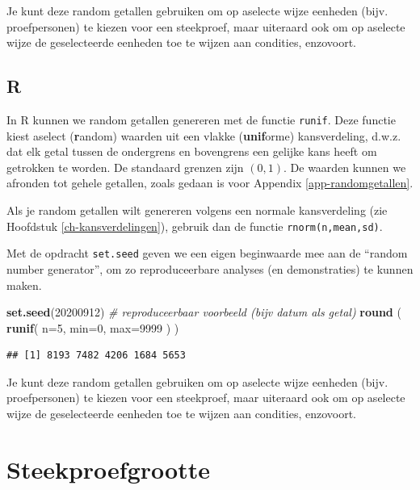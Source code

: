 \documentclass[
]{book}
\newenvironment{Shaded}{\begin{snugshade}}{\end{snugshade}}
\newcommand{\AttributeTok}[1]{\textcolor[rgb]{0.13,0.29,0.53}{#1}}
\newcommand{\CommentTok}[1]{\textcolor[rgb]{0.56,0.35,0.01}{\textit{#1}}}
\newcommand{\DecValTok}[1]{\textcolor[rgb]{0.00,0.00,0.81}{#1}}
\newcommand{\FunctionTok}[1]{\textcolor[rgb]{0.13,0.29,0.53}{\textbf{#1}}}
\newcommand{\NormalTok}[1]{#1}
\begin{document}
Je kunt deze random getallen gebruiken om op aselecte wijze eenheden (bijv. proefpersonen) te kiezen voor een steekproef, maar uiteraard ook om op aselecte wijze de geselecteerde eenheden toe te wijzen aan condities, enzovoort.

\subsection{R}\label{r}

In R kunnen we random getallen genereren met de functie \texttt{runif}. Deze functie kiest aselect (\textbf{r}andom) waarden uit een vlakke (\textbf{unif}orme) kansverdeling, d.w.z. dat elk getal tussen de ondergrens en bovengrens een gelijke kans heeft om getrokken te worden. De standaard grenzen zijn \((0,1)\). De waarden kunnen we afronden tot gehele getallen, zoals gedaan is voor Appendix \ref{app-randomgetallen}.

Als je random getallen wilt genereren volgens een normale kansverdeling (zie Hoofdstuk \ref{ch-kansverdelingen}), gebruik dan de functie \texttt{rnorm(n,mean,sd)}.

Met de opdracht \texttt{set.seed} geven we een eigen beginwaarde mee aan de ``random number generator'', om zo reproduceerbare analyses (en demonstraties) te kunnen maken.

\begin{Shaded}
\begin{Highlighting}[]
\FunctionTok{set.seed}\NormalTok{(}\DecValTok{20200912}\NormalTok{) }\CommentTok{\# reproduceerbaar voorbeeld (bijv datum als getal)}
\FunctionTok{round}\NormalTok{ ( }\FunctionTok{runif}\NormalTok{( }\AttributeTok{n=}\DecValTok{5}\NormalTok{, }\AttributeTok{min=}\DecValTok{0}\NormalTok{, }\AttributeTok{max=}\DecValTok{9999}\NormalTok{ ) )}
\end{Highlighting}
\end{Shaded}

\begin{verbatim}
## [1] 8193 7482 4206 1684 5653
\end{verbatim}

Je kunt deze random getallen gebruiken om op aselecte wijze eenheden (bijv. proefpersonen) te kiezen voor een steekproef, maar uiteraard ook om op aselecte wijze de geselecteerde eenheden toe te wijzen aan condities, enzovoort.

\section{Steekproefgrootte}\label{sec:steekproefgrootte}
\end{document}
